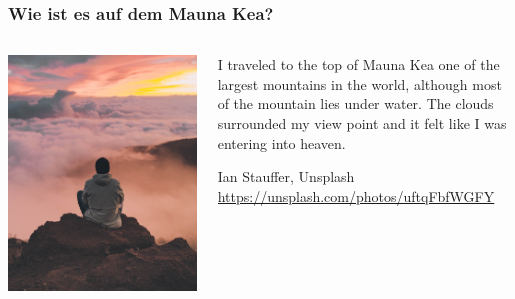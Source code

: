 \documentclass{beamer}
\begin{document}
\begin{frame}
\frametitle{Wie ist es auf dem Mauna Kea?}

\begin{columns}[c]

\begin{column}{5cm}

\begin{center}

\includegraphics[width=\textwidth]{maunakea.jpg}

\end{center}

\end{column}

\begin{column}{5cm}


\epigraph{I traveled to the top of Mauna Kea one of the largest mountains in the world, although most of the mountain lies under water. The clouds surrounded my view point and it felt like I was entering into heaven.}{Ian Stauffer, Unsplash\\ \url{https://unsplash.com/photos/uftqFbfWGFY}}


\end{column}

\end{columns}

\end{frame}
\end{document}
